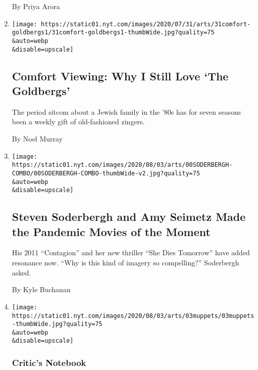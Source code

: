 \begin{enumerate}
  By Priya Arora
\item
  \href{/2020/07/31/arts/television/goldbergs-abc-stream.html}{}

  \texttt{[image: https://static01.nyt.com/images/2020/07/31/arts/31comfort-goldbergs1/31comfort-goldbergs1-thumbWide.jpg?quality=75\\\&auto=webp\\\&disable=upscale]}

  \hypertarget{comfort-viewing-why-i-still-love-the-goldbergs}{%
  \subsection{Comfort Viewing: Why I Still Love `The
  Goldbergs'}\label{comfort-viewing-why-i-still-love-the-goldbergs}}

  The period sitcom about a Jewish family in the '80s has for seven
  seasons been a weekly gift of old-fashioned zingers.

  By Noel Murray
\item
  \href{/2020/07/31/movies/steven-soderbergh-amy-seimetz-pandemic.html}{}

  \texttt{[image: https://static01.nyt.com/images/2020/08/03/arts/00SODERBERGH-COMBO/00SODERBERGH-COMBO-thumbWide-v2.jpg?quality=75\\\&auto=webp\\\&disable=upscale]}

  \hypertarget{steven-soderbergh-and-amy-seimetz-made-the-pandemic-movies-of-the-moment}{%
  \subsection{Steven Soderbergh and Amy Seimetz Made the Pandemic Movies
  of the
  Moment}\label{steven-soderbergh-and-amy-seimetz-made-the-pandemic-movies-of-the-moment}}

  His 2011 ``Contagion'' and her new thriller ``She Dies Tomorrow'' have
  added resonance now. ``Why is this kind of imagery so compelling?''
  Soderbergh asked.

  By Kyle Buchanan
\item
  \href{/2020/07/31/arts/television/muppets-now.html}{}

  \texttt{[image: https://static01.nyt.com/images/2020/08/03/arts/03muppets/03muppets-thumbWide.jpg?quality=75\\\&auto=webp\\\&disable=upscale]}

  \hypertarget{critics-notebook-3}{%
  \subsubsection{Critic's Notebook}\label{critics-notebook-3}}


\end{enumerate}
